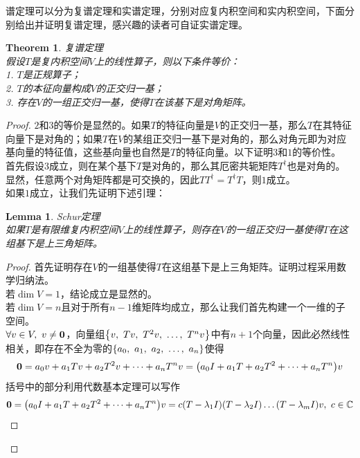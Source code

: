\documentclass[12pt,a4paper,openany,twoside]{book}
\newtheorem{theorem}{Theorem}[section]
\newtheorem{lemma}{Lemma}
\numberwithin{equation}{section}
\begin{document}
        谱定理可以分为复谱定理和实谱定理，分别对应复内积空间和实内积空间，下面分别给出并证明复谱定理，感兴趣的读者可自证实谱定理。
        \begin{theorem} 复谱定理\\
          假设$T$是复内积空间$V$上的线性算子，则以下条件等价：\\
          1. $T$是正规算子；\\
          2. $T$的本征向量构成$V$的正交归一基；\\
          3. 存在$V$的一组正交归一基，使得$T$在该基下是对角矩阵。
        \end{theorem}
        \begin{proof}
          $2$和$3$的等价是显然的。如果$T$的特征向量是$V$的正交归一基，那么$T$在其特征向量下是对角的；如果$T$在$V$的某组正交归一基下是对角的，那么对角元即为对应基向量的特征值，这些基向量也自然是$T$的特征向量。以下证明$3$和$1$的等价性。\\
          首先假设$3$成立，则在某个基下$T$是对角的，那么其厄密共轭矩阵$T^\dagger$也是对角的。显然，任意两个对角矩阵都是可交换的，因此$TT^\dagger=T^\dagger T$，则$1$成立。\\
          如果$1$成立，让我们先证明下述引理：
          \begin{lemma} Schur定理\\
            如果$T$是有限维复内积空间$V$上的线性算子，则存在$V$的一组正交归一基使得$T$在这组基下是上三角矩阵。
          \end{lemma}
          \begin{proof}
            首先证明存在$V$的一组基使得$T$在这组基下是上三角矩阵。证明过程采用数学归纳法。\\
            若$\dim V=1$，结论成立是显然的。\\
            若$\dim V=n$且对于所有$n-1$维矩阵均成立，那么让我们首先构建一个一维的子空间。\\
            $\forall v\in V,\ v\neq\vb{0}$，向量组$\qty{v,\ Tv,\ T^2v,\ \dots,\ T^nv}$中有$n+1$个向量，因此必然线性相关，即存在不全为零的$\qty{a_0,\ a_1,\ a_2,\ \dots,\ a_n}$使得
            \begin{equation}
              \vb{0}=a_0v+a_1Tv+a_2T^2v+\dots+a_nT^nv=\qty(a_0I+a_1T+a_2T^2+\dots+a_nT^n)v
            \end{equation}
            括号中的部分利用代数基本定理可以写作
            \begin{equation}
              \vb*{0}=\qty(a_0I+a_1T+a_2T^2+\dots+a_nT^n)v=c\qty(T-\lambda_1I)\qty(T-\lambda_2I)\dots\qty(T-\lambda_mI)v,\ c\in\mathbb{C}

\end{equation}
\end{proof}
\end{proof}
\end{document}
